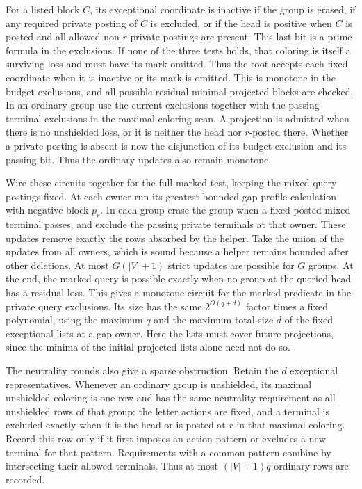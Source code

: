 For a listed block $C$, its exceptional coordinate
is inactive if the group is erased, if any required
private posting of $C$ is excluded, or if the head
is positive when $C$ is posted and all allowed
non-$r$ private postings are present. This last bit
is a prime formula in the exclusions. If none of
the three tests holds, that coloring is itself a
surviving loss and must have its mark omitted.
Thus the root accepts each fixed coordinate when
it is inactive or its mark is omitted. This is
monotone in the budget exclusions, and all possible
residual minimal projected blocks are checked.
In an ordinary group use the current exclusions
together with the passing-terminal exclusions
in the maximal-coloring scan. A projection is
admitted when there is no unshielded loss, or it
is neither the head nor $r$-posted there. Whether a
private posting is absent is now the disjunction
of its budget exclusion and its passing bit.
Thus the ordinary updates also remain monotone.

Wire these circuits together for the full marked
test, keeping the mixed query postings fixed.
At each owner run its greatest bounded-gap profile
calculation with negative block $p_r$. In each group
erase the group when a fixed posted mixed terminal
passes, and exclude the passing private terminals
at that owner. These updates remove exactly the rows
absorbed by the helper. Take the union of the
updates from all owners, which is sound because
a helper remains bounded after other deletions.
At most $G(|V|+1)$ strict updates are possible
for $G$ groups. At the end, the marked query is
possible exactly when no group at the queried head
has a residual loss. This gives a monotone circuit
for the marked predicate in the private query
exclusions. Its size has the same
$2^{O(q+d)}$ factor times a fixed polynomial,
using the maximum $q$ and the maximum total size
$d$ of the fixed exceptional lists at a gap owner.
Here the lists must cover future projections,
since the minima of the initial projected lists
alone need not do so.

The neutrality rounds also give a sparse obstruction.
Retain the $d$ exceptional representatives. Whenever
an ordinary group is unshielded, its maximal
unshielded coloring is one row and has the same
neutrality requirement as all unshielded rows of
that group: the letter actions are fixed, and a
terminal is excluded exactly when it is the head
or is posted at $r$ in that maximal coloring.
Record this row only if it first imposes an action
pattern or excludes a new terminal for that
pattern. Requirements with a common pattern
combine by intersecting their allowed terminals.
Thus at most $(|V|+1)q$ ordinary rows are recorded.

